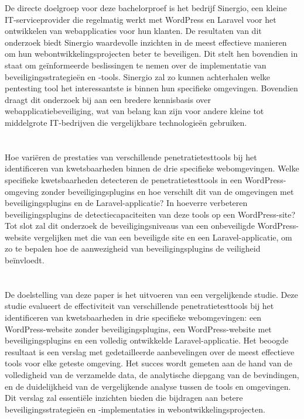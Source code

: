 De directe doelgroep voor deze bachelorproef is het bedrijf Sinergio, een kleine IT-serviceprovider die regelmatig 
werkt met WordPress en Laravel voor het ontwikkelen van webapplicaties voor hun klanten. De resultaten van dit 
onderzoek biedt Sinergio waardevolle inzichten in de meest effectieve manieren om hun webontwikkelingsprojecten beter 
te beveiligen. Dit stelt hen bovendien in staat om geïnformeerde beslissingen te nemen over de implementatie van 
beveiligingsstrategieën en -tools. Sinergio zal zo kunnen achterhalen welke pentesting tool het interessantste is binnen hun specifieke omgevingen.
Bovendien draagt dit onderzoek bij aan een bredere kennisbasis over webapplicatiebeveiliging, 
wat van belang kan zijn voor andere kleine tot middelgrote IT-bedrijven die vergelijkbare technologieën gebruiken.

\section{}%
\label{sec:onderzoeksvraag}
Hoe variëren de prestaties van verschillende penetratietesttools bij het identificeren van kwetsbaarheden binnen de drie 
specifieke webomgevingen. Welke specifieke kwetsbaarheden detecteren de penetratietesttools in een WordPress-omgeving zonder 
beveiligingsplugins en hoe verschilt dit van de omgevingen met beveiligingsplugins en de Laravel-applicatie? 
In hoeverre verbeteren beveiligingsplugins de detectiecapaciteiten van deze tools op een WordPress-site? 
Tot slot zal dit onderzoek de beveiligingsniveaus van een onbeveiligde WordPress-website vergelijken met die 
van een beveiligde site en een Laravel-applicatie, om zo te bepalen hoe de aanwezigheid van beveiligingsplugins de 
veiligheid beïnvloedt.

\section{}%
\label{sec:onderzoeksdoelstelling}
De doelstelling van deze paper is het uitvoeren van een vergelijkende studie. Deze studie evalueert de effectiviteit van 
verschillende penetratietesttools bij het identificeren van kwetsbaarheden in drie specifieke webomgevingen: een WordPress-website 
zonder beveiligingsplugins, een WordPress-website met beveiligingsplugins en een volledig ontwikkelde Laravel-applicatie.
Het beoogde resultaat is een verslag met gedetailleerde aanbevelingen over de meest effectieve tools voor elke geteste 
omgeving. Het succes wordt gemeten aan de hand van de volledigheid van de verzamelde data, de analytische diepgang van de bevindingen, 
en de duidelijkheid van de vergelijkende analyse tussen de tools en omgevingen. Dit verslag zal essentiële inzichten bieden die 
bijdragen aan betere beveiligingsstrategieën en -implementaties in webontwikkelingsprojecten.
